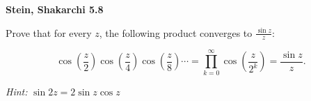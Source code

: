 \textbf{Stein, Shakarchi 5.8}

Prove that for every $z$, the following product converges to $\frac{\sin{z}}{z}$:

$$
\cos{\left(\frac{z}{2}\right)} \cos{\left(\frac{z}{4}\right)} \cos{\left(\frac{z}{8}\right)} \cdots 
  = \prod_{k=0}^{\infty} \cos{\left(\frac{z}{2^k}\right)}
  = \frac{\sin{z}}{z}.
$$

\textit{Hint: } $\sin{2z} = 2 \sin{z} \cos{z}$

\begin{solution}
  \ \\
\end{solution}
